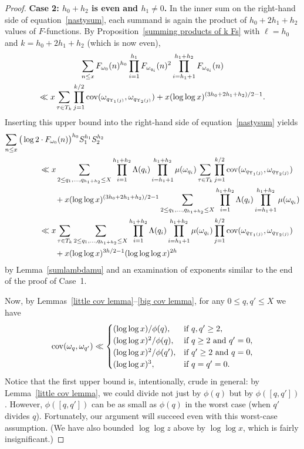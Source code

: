 \documentclass[12pt,reqno]{amsart}
\theoremstyle{definition}
\newcommand{\cov}{\mathop{\rm cov}\nolimits}
\begin{document}
\begin{proof}
\medskip\noindent \textbf{Case 2: $h_0+ h_2$ is even and $h_1\ne0$.}
In the inner sum on the right-hand side of equation~\eqref{nastysum},
each summand is again the product of $h_0 + 2h_1 + h_2$ values of $F$-functions. By Proposition~\ref{summing products of k Fs} with $\ell=h_0$ and $k=h_0 + 2h_1 + h_2$ (which is now even),
\begin{multline*}
\sum_{n \leq x} F_{\omega_0}(n)^{h_0} \prod_{i = 1}^{h_1} F_{\omega_{q_i}}(n)^2 \prod_{i = h_1 + 1}^{h_1 + h_2} F_{\omega_{q_i}}(n) \\
\ll x \sum_{\tau \in T_k} \prod_{j = 1}^{k/2} \cov(\omega_{q_{\Upsilon_1(j)}}, \omega_{q_{\Upsilon_2(j)}}) + x(\log\log x)^{(3h_0 + 2h_1 + h_2)/2-1}.
\end{multline*}
Inserting this upper bound into the right-hand side of equation~\eqref{nastysum} yields
\begin{align}
\sum_{n \leq x} \big( \log 2 & {}\cdot F_{\omega_0}(n) \big)^{h_0} S_1^{h_1}S_2^{h_2} \notag \\
&\ll x \sum_{2\le q_1, \ldots, q_{h_1 + h_2} \leq X} \prod_{i = 1}^{h_1 + h_2} \Lambda(q_i) \prod_{i = h_1 + 1}^{h_1 + h_2} \mu(\omega_{q_i}) \sum_{\tau \in T_k} \prod_{j = 1}^{k/2} \cov(\omega_{q_{\Upsilon_1(j)}}, \omega_{q_{\Upsilon_2(j)}}) \notag \\
&\qquad{}+ x (\log\log x)^{(3h_0 + 2h_1 + h_2)/2 - 1} \sum_{2\le q_1, \ldots, q_{h_1 + h_2} \leq X} \prod_{i = 1}^{h_1 + h_2} \Lambda(q_i) \prod_{i = h_1 + 1}^{h_1 + h_2} \mu(\omega_{q_i}) \notag \\
&\ll x \sum_{\tau \in T_k} \sum_{2\le q_1, \ldots, q_{h_1 + h_2} \leq X} \prod_{i = 1}^{h_1 + h_2} \Lambda(q_i) \prod_{i = h_1 + 1}^{h_1 + h_2} \mu(\omega_{q_i}) \prod_{j = 1}^{k/2} \cov(\omega_{q_{\Upsilon_1(j)}}, \omega_{q_{\Upsilon_2(j)}}) \notag \\
&\qquad{}+ x (\log\log x)^{3h/2 - 1} (\log\log\log x)^{2h}  \label{key cov product}
\end{align}
by Lemma~\ref{sumlambdamu} and an examination of exponents similar to the end of the proof of Case~1.

Now, by Lemmas~\ref{little cov lemma}--\ref{big cov lemma}, for any $0\le q,q'\le X$ we have
\begin{equation}  \label{cov cases}
\cov(\omega_{q}, \omega_{q'}) \ll \begin{cases}
(\log\log x)/\phi(q), & \text{if } q,q'\ge 2, \\
(\log\log x)^2/\phi(q), & \text{if } q\ge2 \text{ and } q'=0, \\
(\log\log x)^2/\phi(q'), & \text{if } q'\ge2 \text{ and } q=0, \\
(\log\log x)^3, & \text{if } q=q'=0.
\end{cases}
\end{equation}
Notice that the first upper bound is, intentionally, crude in general: by Lemma~\ref{little cov lemma}, we could divide not just by $\phi(q)$ but by $\phi([q,q'])$. However, $\phi([q,q'])$ can be as small as $\phi(q)$ in the worst case (when $q'$ divides $q$). Fortunately, our argument will succeed even with this worst-case assumption. (We have also bounded $\log\log z$ above by $\log\log x$, which is fairly insignificant.)


\end{proof}
\end{document}
